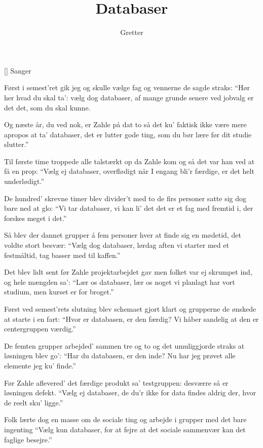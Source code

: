 \documentclass[a4paper,11pt]{article}
\title{Databaser}
\author{Gretter}
\begin{document}
\maketitle

\begin{roles}
[] Sanger
\end{roles}


\begin{song}
%
Først i semest'ret gik jeg og skulle vælge fag
og vennerne de sagde straks: ``Hør her hvad du skal ta':
vælg dog databaser, af mange grunde
senere ved jobvalg er det det, som du skal kunne.

Og næste år, du ved nok, er Zahle på dat to
så det ku' faktisk ikke være mere apropos
at ta' databaser, det er lutter
gode ting, som du bør lære før dit studie slutter.''

Til første time troppede alle talstærkt op
da Zahle kom og så det var han ved at få en prop:
``Vælg ej databaser, overflødigt
når I engang bli'r færdige, er det helt underlødigt.''

De hundred' skrevne timer blev divider't med to
de firs personer satte sig dog bare ned at glo:
``Vi tar databaser, vi kan li' det
det er et fag med fremtid i, der forskes meget i det.''

Så blev der dannet grupper á fem personer hver
at finde sig en mødetid, det voldte stort besvær:
``Vælg dog databaser, lørdag aften
vi starter med et festmåltid, tag basser med til kaffen.''

Det blev lidt sent før Zahle projektarbejdet gav
men folket var ej skrumpet ind, og hele mængden sa':
``Lær os databaser, lær os noget
vi planlagt har vort studium, men kurset er for broget.''

Først ved semest'rets slutning blev schemaet gjort klart
og grupperne de ønskede at starte i en fart:
``Hvor er databasen, er den færdig?
Vi håber sandelig at den er centergruppen værdig.''

De femten grupper arbejded' sammen tre og to
og det umuliggjorde straks at løsningen blev go':
``Har du databasen, er den inde?
Nu har jeg prøvet alle elemente jeg ku' finde.''

Før Zahle aflevered' det færdige produkt
sa' testgruppen: desværre så er løsningen defekt.
``Vælg ej databaser, de du'r ikke
for data findes aldrig der, hvor de reelt sku' ligge.''

Folk lærte dog en masse om de sociale ting
og arbejde i grupper med det bare ingenting
``Vælg kun databaser, for at fejre
at det sociale sammenvær kan det faglige besejre.''
\end{song}
\end{document}
